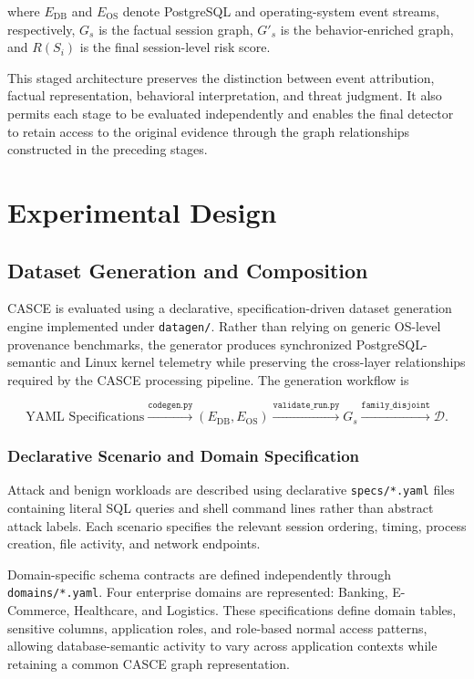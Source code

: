 \documentclass[conference]{IEEEtran}
\begin{document}
where $E_{\mathrm{DB}}$ and $E_{\mathrm{OS}}$ denote PostgreSQL and operating-system event streams, respectively, $G_s$ is the factual session graph, $G'_s$ is the behavior-enriched graph, and $R(S_i)$ is the final session-level risk score.

This staged architecture preserves the distinction between event attribution, factual representation, behavioral interpretation, and threat judgment. It also permits each stage to be evaluated independently and enables the final detector to retain access to the original evidence through the graph relationships constructed in the preceding stages.

\section{Experimental Design}

\subsection{Dataset Generation and Composition}
\label{subsec:dataset_gen}

CASCE is evaluated using a declarative, specification-driven dataset
generation engine implemented under \texttt{datagen/}. Rather than relying
on generic OS-level provenance benchmarks, the generator produces
synchronized PostgreSQL-semantic and Linux kernel telemetry while preserving
the cross-layer relationships required by the CASCE processing pipeline.
The generation workflow is

\[
\text{YAML Specifications}
\xrightarrow{\texttt{codegen.py}}
(E_{\mathrm{DB}},E_{\mathrm{OS}})
\xrightarrow{\texttt{validate\_run.py}}
G_s
\xrightarrow{\texttt{family\_disjoint}}
\mathcal{D}.
\]

\subsubsection{Declarative Scenario and Domain Specification}

Attack and benign workloads are described using declarative
\texttt{specs/*.yaml} files containing literal SQL queries and shell command
lines rather than abstract attack labels. Each scenario specifies the
relevant session ordering, timing, process creation, file activity, and
network endpoints.

Domain-specific schema contracts are defined independently through
\texttt{domains/*.yaml}. Four enterprise domains are represented:
Banking, E-Commerce, Healthcare, and Logistics. These specifications define
domain tables, sensitive columns, application roles, and role-based normal
access patterns, allowing database-semantic activity to vary across
application contexts while retaining a common CASCE graph representation.
\end{document}
